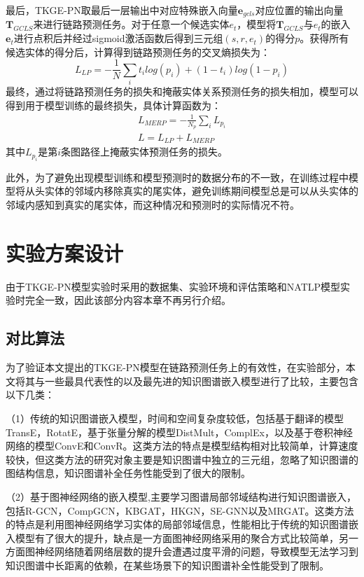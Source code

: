 最后，TKGE-PN取最后一层输出中对应特殊嵌入向量$\boldsymbol{e}_{gcls}$对应位置的输出向量$\boldsymbol{T}_{GCLS}$来进行链路预测任务。对于任意一个候选实体$e_t$，模型将$\boldsymbol{T}_{GCLS}$与$e_t$的嵌入$\boldsymbol{e}_{t}$进行点积后并经过sigmoid激活函数后得到三元组$(s,r,e_t)$的得分$p$。获得所有候选实体的得分后，计算得到链路预测任务的交叉熵损失为：
\begin{equation}
  L_{LP} = -\frac{1}{N}\sum\limits_{i}t_ilog(p_i)+(1-t_i)log(1-p_i)
\end{equation}
最终，通过将链路预测任务的损失和掩蔽实体关系预测任务的损失相加，模型可以得到用于模型训练的最终损失，具体计算函数为：
\begin{gather}
  L_{MERP} = -\frac{1}{N_p}\sum\limits_{i}L_{p_{i}}\\
  L=L_{LP}+L_{MERP}
\end{gather}
其中$L_{p_{i}}$是第$i$条图路径上掩蔽实体预测任务的损失。

此外，为了避免出现模型训练和模型预测时的数据分布的不一致，在训练过程中模型将从头实体的邻域内移除真实的尾实体，避免训练期间模型总是可以从头实体的邻域内感知到真实的尾实体，而这种情况和预测时的实际情况不符。


\section{实验方案设计}

由于TKGE-PN模型实验时采用的数据集、实验环境和评估策略和NATLP模型实验时完全一致，因此该部分内容本章不再另行介绍。

\subsection{对比算法}

为了验证本文提出的TKGE-PN模型在链路预测任务上的有效性，在实验部分，本文将其与一些最具代表性的以及最先进的知识图谱嵌入模型进行了比较，主要包含以下几类：

（1）传统的知识图谱嵌入模型，时间和空间复杂度较低，包括基于翻译的模型TransE，RotatE，基于张量分解的模型DistMult，ComplEx，以及基于卷积神经网络的模型ConvE和ConvR。这类方法的特点是模型结构相对比较简单，计算速度较快，但这类方法的研究对象主要是知识图谱中独立的三元组，忽略了知识图谱的图结构信息，知识图谱补全任务性能受到了很大的限制。

（2）基于图神经网络的嵌入模型,主要学习图谱局部邻域结构进行知识图谱嵌入，包括R-GCN，CompGCN，KBGAT，HKGN，SE-GNN以及MRGAT。这类方法的特点是利用图神经网络学习实体的局部邻域信息，性能相比于传统的知识图谱嵌入模型有了很大的提升，缺点是一方面图神经网络采用的聚合方式比较简单，另一方面图神经网络随着网络层数的提升会遭遇过度平滑的问题，导致模型无法学习到知识图谱中长距离的依赖，在某些场景下的知识图谱补全性能受到了限制。


